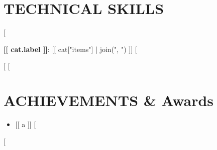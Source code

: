 \documentclass[letterpaper,11pt]{article}
\begin{document}
\section{TECHNICAL SKILLS}
\begin{itemize}[label={}, leftmargin=0in, itemsep=1pt]
\small{
[%
  \item \textbf{[[ cat.label ]]}{: [[ cat["items"] | join(", ") ]]}
[%
}
\end{itemize}
[%
[%

\section{ACHIEVEMENTS \& Awards}
\begin{itemize}
[%
  \item \small{[[ a ]]}
[%
\end{itemize}
[%
\end{document}
